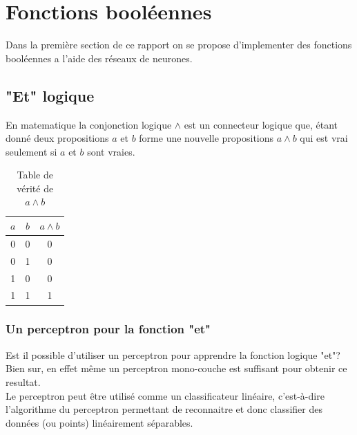 \documentclass[twoside,openright,a4paper,11pt,french]{article}
\begin{document}
\pagestyle{plain}
\setlength{\parindent}{0pt}



\parskip=0pt
\tableofcontents
\clearpage


\vspace{5cm}


\section{Fonctions booléennes}

Dans la première section de ce rapport on se propose
d'implementer des fonctions booléennes a l'aide des réseaux
de neurones. 

\subsection{"Et" logique}

En matematique la conjonction logique $\land$ est un
connecteur logique que, étant donné deux propositions $a$ et $b$
forme une nouvelle propositions $a \land b$ qui est vrai seulement
si $a$ et $b$ sont vraies.

\begin{table}[ht]
  \centering
  \begin{tabular}{| c | c | c |}
    \hline
    \textbf{$a$} & \textbf{$b$} & \textbf{$a \land b$}\\
    \hline
    0 & 0  & 0 \\
    \hline
    0 & 1  & 0 \\
    \hline
    1 & 0  & 0 \\
    \hline
    1 & 1  & 1 \\
    \hline
  \end{tabular}
  \caption{Table de vérité de $a \land b$}
  \label{tab:et}
\end{table}




\subsubsection{Un perceptron pour la fonction "et"} 

Est il possible d'utiliser un perceptron pour apprendre la fonction logique
"et"? Bien sur, en effet même un perceptron mono-couche est suffisant pour
obtenir ce resultat.\\

Le perceptron peut être utilisé comme un classificateur linéaire, c'est-à-dire l'algorithme du
perceptron permettant de reconnaitre et donc classifier des données (ou points)
linéairement séparables.\\
\end{document}
